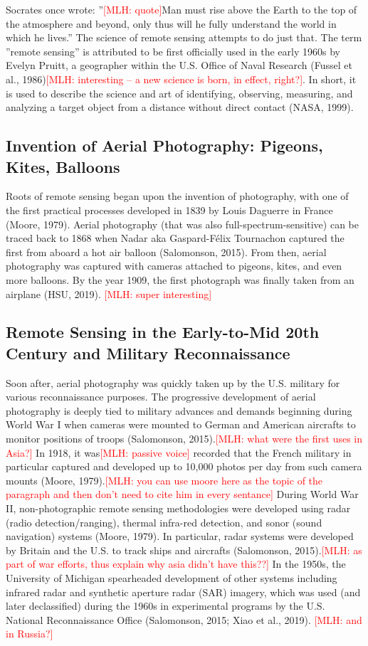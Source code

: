 \documentclass{book}\usepackage{knitr}
\newcommand{\red}[1]{\textcolor{red}{[MLH: #1]}}
\begin{document}
\begin{knitrout}
\begin{kframe}
Socrates once wrote: ''\red{quote}Man must rise above the Earth to the top of the atmosphere and beyond, only thus will he fully understand the world in which he lives.'' The science of remote sensing attempts to do just that. The term ''remote sensing'' is attributed to be first officially used in the early 1960s by Evelyn Pruitt, a geographer within the U.S. Office of Naval Research (Fussel et al., 1986)\red{interesting -- a new science is born, in effect, right?}. In short, it is used to describe the science and art of identifying, observing, measuring, and analyzing a target object from a distance without direct contact (NASA, 1999). 

\subsection{Invention of Aerial Photography: Pigeons, Kites, Balloons}

Roots of remote sensing began upon the invention of photography, with one of the first practical processes developed in 1839 by Louis Daguerre in France (Moore, 1979). Aerial photography (that was also full-spectrum-sensitive) can be traced back to 1868 when Nadar aka Gaspard-Félix Tournachon captured the first from aboard a hot air balloon (Salomonson, 2015). From then, aerial photography was captured with cameras attached to pigeons, kites, and even more balloons. By the year 1909, the first photograph was finally taken from an airplane (HSU, 2019). \red{super interesting}

\subsection{Remote Sensing in the Early-to-Mid 20th Century and Military Reconnaissance}

Soon after, aerial photography was quickly taken up by the U.S. military for various reconnaissance purposes. The progressive development of aerial photography is deeply tied to military advances and demands beginning during World War I when cameras were mounted to German and American aircrafts to monitor positions of troops (Salomonson, 2015).\red{what were the first uses in Asia?} In 1918, it was\red{passive voice} recorded that the French military in particular captured and developed up to 10,000 photos per day from such camera mounts (Moore, 1979).\red{you can use moore here as the topic of the paragraph and then don't need to cite him in every sentance} During World War II, non-photographic remote sensing methodologies were developed using radar (radio detection/ranging), thermal infra-red detection, and sonor (sound navigation) systems (Moore, 1979). In particular, radar systems were developed by Britain and the U.S. to track ships and aircrafts (Salomonson, 2015).\red{as part of war efforts, thus explain why asia didn't have this??} In the 1950s, the University of Michigan spearheaded development of other systems including infrared radar and synthetic aperture radar (SAR) imagery, which was used (and later declassified) during the 1960s in experimental programs by the U.S. National Reconnaissance Office (Salomonson, 2015; Xiao et al., 2019). \red{and in Russia?}


\end{kframe}
\end{knitrout}
\end{document}
